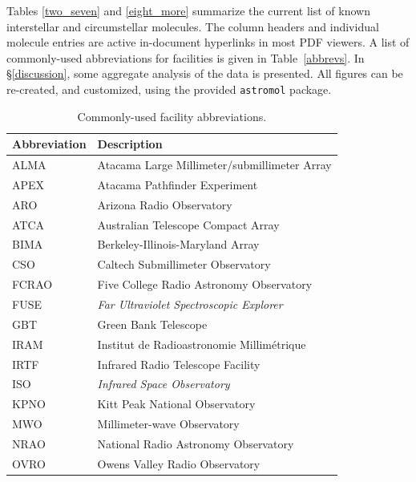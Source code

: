 \documentclass[twocolumn]{aastex631}
\newcommand{\update}[1]{{#1}}
\begin{document}
Tables \ref{two_seven} and \ref{eight_more} summarize the current list of known interstellar and circumstellar molecules.  The column headers and individual molecule entries are active in-document hyperlinks in most PDF viewers.  A list of commonly-used abbreviations for facilities is given in Table~\ref{abbrevs}.  In \S\ref{discussion}, some aggregate analysis of the data is presented.  \update{All figures can be re-created, and customized, using the provided \texttt{astromol} package.}

\begin{table}[h!]
    \centering
    \scriptsize
    \caption{Commonly-used facility abbreviations.}
    \begin{tabular*}{\columnwidth}{l @{\extracolsep{\fill}} l}
    \hline\hline
    Abbreviation    &   Description \\
    \hline
    ALMA            &   Atacama Large Millimeter/submillimeter Array \\
    APEX            &   Atacama Pathfinder Experiment           \\
    ARO             &   Arizona Radio Observatory               \\
    ATCA            &   Australian Telescope Compact Array      \\
    BIMA            &   Berkeley-Illinois-Maryland Array        \\
    CSO             &   Caltech Submillimeter Observatory       \\
    FCRAO           &   Five College Radio Astronomy Observatory           \\
    FUSE            &   \emph{Far Ultraviolet Spectroscopic Explorer}   \\
    GBT             &   Green Bank Telescope                    \\
    IRAM            &   Institut de Radioastronomie Millim\'{e}trique \\
    IRTF            &   Infrared Radio Telescope Facility       \\
    ISO             &   \emph{Infrared Space Observatory}       \\
    KPNO            &   Kitt Peak National Observatory          \\
    MWO             &   Millimeter-wave Observatory             \\   
    NRAO            &   National Radio Astronomy Observatory    \\   
    OVRO            &   Owens Valley Radio Observatory          \\

\end{tabular*}
\end{table}
\end{document}
